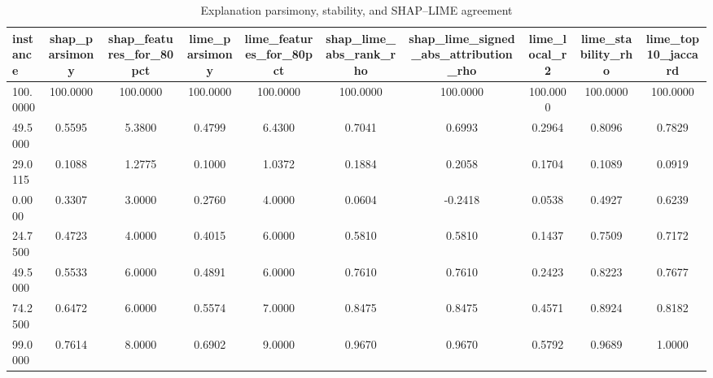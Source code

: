\begin{table}
\centering
\caption{Explanation parsimony, stability, and SHAP--LIME agreement}
\label{tab:explanation_quality}
\begin{tabular}{lccccccccc}
\toprule
instance & shap_parsimony & shap_features_for_80pct & lime_parsimony & lime_features_for_80pct & shap_lime_abs_rank_rho & shap_lime_signed_abs_attribution_rho & lime_local_r2 & lime_stability_rho & lime_top10_jaccard \\
\midrule
100.0000 & 100.0000 & 100.0000 & 100.0000 & 100.0000 & 100.0000 & 100.0000 & 100.0000 & 100.0000 & 100.0000 \\
49.5000 & 0.5595 & 5.3800 & 0.4799 & 6.4300 & 0.7041 & 0.6993 & 0.2964 & 0.8096 & 0.7829 \\
29.0115 & 0.1088 & 1.2775 & 0.1000 & 1.0372 & 0.1884 & 0.2058 & 0.1704 & 0.1089 & 0.0919 \\
0.0000 & 0.3307 & 3.0000 & 0.2760 & 4.0000 & 0.0604 & -0.2418 & 0.0538 & 0.4927 & 0.6239 \\
24.7500 & 0.4723 & 4.0000 & 0.4015 & 6.0000 & 0.5810 & 0.5810 & 0.1437 & 0.7509 & 0.7172 \\
49.5000 & 0.5533 & 6.0000 & 0.4891 & 6.0000 & 0.7610 & 0.7610 & 0.2423 & 0.8223 & 0.7677 \\
74.2500 & 0.6472 & 6.0000 & 0.5574 & 7.0000 & 0.8475 & 0.8475 & 0.4571 & 0.8924 & 0.8182 \\
99.0000 & 0.7614 & 8.0000 & 0.6902 & 9.0000 & 0.9670 & 0.9670 & 0.5792 & 0.9689 & 1.0000 \\
\bottomrule
\end{tabular}
\end{table}
